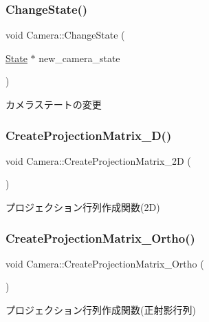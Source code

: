 \subsubsection{\texorpdfstring{Change\+State()}{ChangeState()}}
{\footnotesize\ttfamily void Camera\+::\+Change\+State (\begin{DoxyParamCaption}\item[{\mbox{\hyperlink{class_camera_1_1_state}{State}} $\ast$}]{new\+\_\+camera\+\_\+state }\end{DoxyParamCaption})}



カメラステートの変更 

\mbox{\label{class_camera_aaae8043a952b7675d209bdc9b80bcc3f}} 
\subsubsection{\texorpdfstring{Create\+Projection\+Matrix\+\_\+D()}{CreateProjectionMatrix\_2D()}}
{\footnotesize\ttfamily void Camera\+::\+Create\+Projection\+Matrix\+\_\+2D (\begin{DoxyParamCaption}{ }\end{DoxyParamCaption})}



プロジェクション行列作成関数(2\+D) 

\mbox{\label{class_camera_a215010fc78cb35ed588ac9676c166f64}} 
\subsubsection{\texorpdfstring{Create\+Projection\+Matrix\+\_\+\+Ortho()}{CreateProjectionMatrix\_Ortho()}}
{\footnotesize\ttfamily void Camera\+::\+Create\+Projection\+Matrix\+\_\+\+Ortho (\begin{DoxyParamCaption}{ }\end{DoxyParamCaption})}



プロジェクション行列作成関数(正射影行列) 

